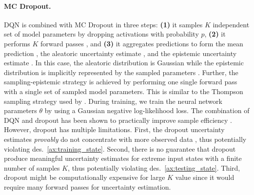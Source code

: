 \paragraph{MC Dropout.} DQN is combined with MC Dropout \cite{drop_out} in three steps: \textbf{(1)} it samples $K$ independent set of model parameters  by dropping activations with probability $p$, \textbf{(2)} it performs $K$ forward passes , and \textbf{(3)} it aggregates predictions to form the mean prediction , the aleatoric uncertainty estimate , and the epistemic uncertainty estimate . In this case, the aleatoric distribution is Gaussian while the epistemic distribution is implicitly represented by the sampled parameters . Further, the sampling-epistemic strategy is achieved by performing one single forward pass with a single set of sampled model parameters. This is similar to the Thompson sampling strategy used by \cite{dropout}. During training, we train the neural network parameters $\theta$ by using a Gaussian negative log-likelihood loss. The combination of DQN and dropout has been shown to practically improve sample efficiency \cite{dropout}. However, dropout has multiple limitations. First, the dropout uncertainty estimates \emph{provably} do not concentrate with more observed data \cite{randomized-prior-functions}, thus potentially violating des.~\ref{ax:training_state}. Second, there is no guarantee that dropout produce meaningful uncertainty estimates for extreme input states with a finite number of samples $K$, thus potentially violating des.~\ref{ax:testing_state}. Third, dropout might be computationally expensive for large $K$ value since it would require many forward passes for uncertainty estimation.

